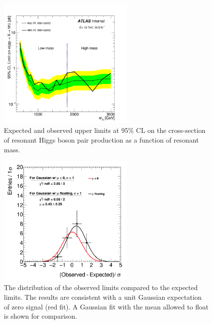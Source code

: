 \begin{figure}[!h]
\begin{center}
\includegraphics*[width=0.60\textwidth] {chapters/dihiggs2/figures/unblinded/limit_unblinded}
\caption[Expected and observed upper limits at 95\% CL on the cross-section of resonant Higgs boson pair production.]{Expected and observed upper limits at 95\% CL on the cross-section of resonant Higgs boson pair production as a function of resonant mass.}
\label{fig:finalLimit}
\end{center}
\end{figure}

\begin{figure}[!h]
\begin{center}
\includegraphics*[width=0.60\textwidth] {chapters/dihiggs2/figures/unblinded/limitSigmaDistribution}
\caption{The distribution of the observed limits compared to the expected limits. The results are consistent with a unit Gaussian expectation of zero signal (red fit). A Gaussian fit with the mean allowed to float is shown for comparison.}
\label{fig:limitSigmaDistribution}
\end{center}
\end{figure}


